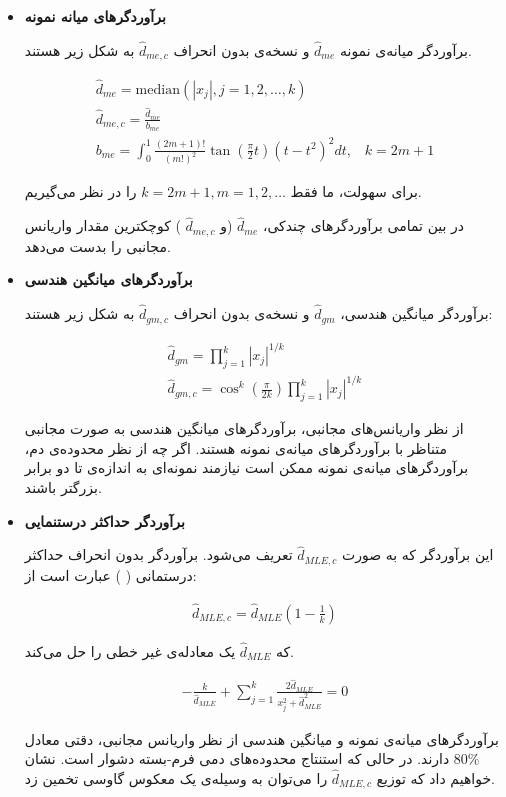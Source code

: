 \begin{itemize}
\item
\textbf{
برآوردگرهای میانه نمونه
}

برآوردگر‌ میانه‌ی نمونه 
$\hat{d}_{me}$
و نسخه‌ی بدون انحراف 
$\hat{d}_{me,c}$
به شکل زیر هستند.

\begin{align}
\hat{d}_{me} = \mathrm{median} \left( \left| x_j \right|, j=1,2, \ldots, k \right)\\
\hat{d}_{me,c} = \frac{\hat{d}_{me}}{b_{me}}\\
b_{me} = \int_0^1 \frac{(2m+1)!}{(m!)^2} \tan \left( \frac{\pi}{2} t \right) \left( t - t^2 \right)^2 dt, \;\;\; k = 2m+1
\label{eq:1iT}
\end{align}

برای سهولت، ما فقط 
$k = 2m+1, m = 1,2, \ldots$
را در نظر می‌گیریم.

در بین تمامی برآوردگرهای چندکی، 
$\hat{d}_{me}$
(و 
$\hat{d}_{me,c}$
) کوچکترین مقدار واریانس مجانبی را بدست می‌دهد.

\item
\textbf{
برآوردگرهای میانگین هندسی
}

برآوردگر میانگین هندسی، 
$\hat{d}_{gm}$
و نسخه‌ی بدون انحراف 
$\hat{d}_{gm,c}$
به شکل زیر هستند:

\begin{align}
\hat{d}_{gm} = \prod_{j=1}^k \left| x_j \right|^{1/k}\\
\hat{d}_{gm,c} = \cos^k \left( \frac{\pi}{2k} \right) \prod_{j=1}^k \left| x_j \right|^{1/k}
\label{eq:1iU.0}
\end{align}

از نظر واریانس‌های مجانبی، برآوردگرهای میانگین هندسی به صورت مجانبی متناظر با برآوردگرهای میانه‌ی نمونه هستند. اگر چه از نظر محدوده‌ی دم، برآوردگرهای میانه‌ی نمونه ممکن است نیازمند نمونه‌ای به اندازه‌ی تا دو برابر بزرگتر باشند.

\item
\textbf{
برآوردگر حداکثر درستنمایی
}

این برآوردگر که به صورت 
$\hat{d}_{MLE,c}$
تعریف می‌شود. برآوردگر بدون انحراف حداکثر درستمانی (
) عبارت است از:

\begin{align}
\hat{d}_{MLE,c} = \hat{d}_{MLE} \left( 1 - \frac{1}{k} \right)
\label{eq:1iU.1}
\end{align}

که 
$\hat{d}_{MLE}$
یک معادله‌ی غیر خطی 
را حل می‌کند.

\begin{align}
- \frac{k}{\hat{d}_{MLE}} + \sum_{j=1}^k \frac{2\hat{d}_{MLE}}{x_j^2 + \hat{d}_{MLE}^2 } = 0
\label{eq:1iV}
\end{align}

برآوردگرهای میانه‌ی نمونه و میانگین هندسی از نظر واریانس مجانبی، دقتی معادل 
$80\%$
دارند. در حالی که استنتاج محدوده‌های دمی فرم-بسته دشوار است. نشان‌ خواهیم داد که توزیع 
$\hat{d}_{MLE,c}$
را می‌توان به وسیله‌ی یک معکوس گاوسی%
تخمین زد.

\end{itemize}



